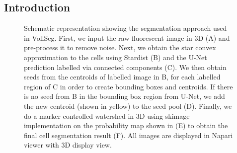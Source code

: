 \documentclass[letterpaper,compsoc,twoside]{IEEEtran}
\begin{document}
\subsection{Introduction%
  \label{introduction}%
}
\begin{figure}[]\noindent{}
\caption{Schematic representation showing the segmentation approach used in VollSeg. First, we input the raw fluorescent image in 3D (A) and pre-process it to remove noise. Next, we obtain the star convex approximation to the cells using Stardist (B) and the U-Net prediction labelled via connected components (C). We then obtain seeds from the centroids of labelled image in B, for each labelled region of C in order to create bounding boxes and centroids. If there is no seed from B in the bounding box region from U-Net, we add the new centroid (shown in yellow) to the seed pool (D). Finally, we do a marker controlled watershed in 3D using skimage implementation on the probability map shown in (E) to obtain the final cell segmentation result (F). All images are displayed in Napari viewer with 3D display view.}

\end{figure}
\end{document}
